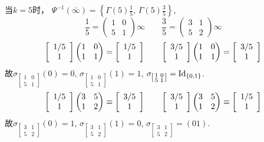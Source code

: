 \begin{example1}\label{example:Gamma5}
	当$k=5$时， $\displaystyle\Psi^{-1}(\bar{\infty})=\left\{\Gamma(5)\frac{1}{5},\,\Gamma(5)\frac{3}{5} \right \}$,
	$$\frac{1}{5}= \begin{pmatrix}
	1 & 0 \\ 5 & 1
	\end{pmatrix}\infty \qquad \frac{3}{5}= \begin{pmatrix}
	3 & 1 \\ 5 & 2
	\end{pmatrix}\infty$$
	$$\left[\begin{array}{c}{1/5} \\ {1}\end{array}\right] \begin{pmatrix}
	1 & 0 \\ 1 & 1
	\end{pmatrix} =\left[\begin{array}{c}{1/5} \\ {1}\end{array}\right] \qquad 
	\left[\begin{array}{c}{3/5} \\ {1}\end{array}\right] \begin{pmatrix}
	1 & 0 \\ 1 & 1
	\end{pmatrix} =\left[\begin{array}{c}{3/5} \\ {1}\end{array}\right]$$
	故$\sigma_{\left[\begin{smallmatrix}
		1 & 0 \\ 5 & 1
		\end{smallmatrix}\right]} (0)=0$, $\sigma_{\left[\begin{smallmatrix}
		1 & 0 \\ 5 & 1
		\end{smallmatrix}\right]} (1)=1$,
	$\sigma_{\left[\begin{smallmatrix}
		1 & 0 \\ 5 & 1
		\end{smallmatrix}\right]} =\operatorname{\operatorname{Id}}_{\{0,1\}}$.
	$$\left[\begin{array}{c}{1/5} \\ {1}\end{array}\right] \begin{pmatrix}
	3 & 5 \\ 1 & 2
	\end{pmatrix} \equiv\left[\begin{array}{c}{3/5} \\ {1}\end{array}\right] \qquad 
	\left[\begin{array}{c}{3/5} \\ {1}\end{array}\right] \begin{pmatrix}
	3 & 5 \\ 1 & 2
	\end{pmatrix} \equiv\left[\begin{array}{c}{1/5} \\ {1}\end{array}\right]$$ 	
	故$\sigma_{\left[\begin{smallmatrix}
		3 & 1 \\ 5 & 2
		\end{smallmatrix}\right]} (0)=1$, $\sigma_{\left[\begin{smallmatrix}
		3 & 1 \\ 5 & 2
		\end{smallmatrix}\right]} (1)=0$,
	$\sigma_{\left[\begin{smallmatrix}
		3 & 1 \\ 5 & 2
		\end{smallmatrix}\right]} =(01)$.
\end{example1}
